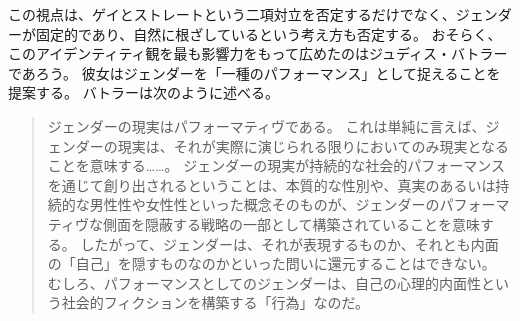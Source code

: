\documentclass[paper=a4,book,openany]{jlreq}
\newcommand{\ig}[1]{}           %
\begin{document}
この視点は、ゲイとストレートという二項対立を否定するだけでなく、ジェンダーが固定的であり、自然に根ざしているという考え方も否定する。
おそらく、このアイデンティティ観を最も影響力をもって広めたのはジュディス・バトラー\ig{(Judith Butler)}であろう。
彼女はジェンダーを「一種のパフォーマンス」として捉えることを提案する。
バトラーは次のように述べる。

\begin{quote}
ジェンダーの現実はパフォーマティヴである。
これは単純に言えば、ジェンダーの現実は、それが実際に演じられる限りにおいてのみ現実となることを意味する……。
ジェンダーの現実が持続的な社会的パフォーマンスを通じて創り出されるということは、本質的な性別や、真実のあるいは持続的な男性性や女性性といった概念そのものが、ジェンダーのパフォーマティヴな側面を隠蔽する戦略の一部として構築されていることを意味する。
したがって、ジェンダーは、それが表現するものか、それとも内面の「自己」を隠すものなのかといった問いに還元することはできない。
むしろ、パフォーマンスとしてのジェンダーは、自己の心理的内面性という社会的フィクションを構築する「行為」なのだ。\citep[pp. 527-528]{butler88:_perfor_acts_gender_const}

\end{quote}
\end{document}
